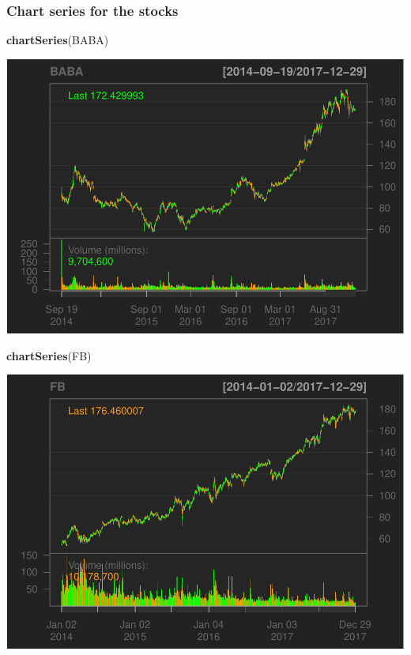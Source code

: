 \documentclass[]{article}
\newenvironment{Shaded}{\begin{snugshade}}{\end{snugshade}}
\newcommand{\KeywordTok}[1]{\textcolor[rgb]{0.13,0.29,0.53}{\textbf{#1}}}
\newcommand{\NormalTok}[1]{#1}
\begin{document}
\subsubsection{Chart series for the
stocks}\label{chart-series-for-the-stocks}

\begin{Shaded}
\begin{Highlighting}[]
\KeywordTok{chartSeries}\NormalTok{(BABA)}
\end{Highlighting}
\end{Shaded}

\includegraphics{Markowitz_Research_Me_files/figure-latex/unnamed-chunk-3-1.pdf}

\begin{Shaded}
\begin{Highlighting}[]
\KeywordTok{chartSeries}\NormalTok{(FB)}
\end{Highlighting}
\end{Shaded}

\includegraphics{Markowitz_Research_Me_files/figure-latex/unnamed-chunk-3-2.pdf}
\end{document}
